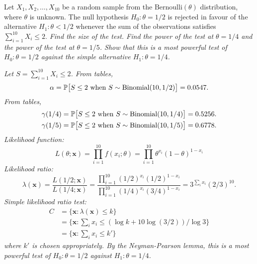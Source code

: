 \begin{example}
Let $X_1,X_2,\ldots,X_{10}$ be a random sample from the $\text{Bernoulli}(\theta)$ distribution, where $\theta$ is unknown. The null hypothesis $H_0:\theta=1/2$ is rejected in favour of the alternative $H_1:\theta < 1/2$ whenever the sum of the observations satisfies $\sum_{i=1}^{10}X_i \leq 2$. 
\ben
\it Find the size of the test.
\it Find the power of the test at $\theta=1/4$ and the power of the test at $\theta=1/5$.
\it Show that this is a most powerful test of $H_0:\theta=1/2$ against the simple alternative $H_1:\theta=1/4$.
\een
\begin{solution}
\ben
\it %
Let $S = \sum_{i=1}^{10}X_i \leq 2$. From tables,
\[
\alpha = \prob\big[S\leq 2 \text{ when } S\sim\text{Binomial}(10,1/2)\big] = 0.0547.%
\]
\it %
From tables,
\begin{align*}
\gamma(1/4) & = \mathbb{P}\big[S\leq 2 \text{ when } S\sim\text{Binomial}(10,1/4)\big] = 0.5256. \\
\gamma(1/5) & = \mathbb{P}\big[S\leq 2 \text{ when } S\sim\text{Binomial}(10,1/5)\big] = 0.6778.
\end{align*}
\it %
Likelihood function:
\[
L(\theta;\mathbf{x}) = \prod_{i=1}^{10}f(x_i;\theta) = \prod_{i=1}^{10}\theta^{x_i}(1-\theta)^{1-x_i}
\]
Likelihood ratio:
\[
\lambda(\mathbf{x}) 
	= \frac{L(1/2;\mathbf{x})}{L(1/4;\mathbf{x})}
	= \frac{\prod_{i=1}^{10}(1/2)^{x_i}(1/2)^{1-x_i}}{\prod_{i=1}^{10}(1/4)^{x_i}(3/4)^{1-x_i}}
	= 3^{\sum_i x_i}(2/3)^{10}.
\]
Simple likelihood ratio test: 
\begin{align*}
C 
	& = \{\mathbf{x}:\lambda(\mathbf{x})\leq k\} \\
	& = \big\{\mathbf{x}:\sum_i x_i \leq (\log k + 10\log(3/2))/\log 3 \big\} \\
	& = \{\mathbf{x}:\sum_i x_i \leq k' \}
\end{align*}	
where $k'$ is chosen appropriately. By the Neyman-Pearson lemma, this is a most powerful test of $H_0:\theta=1/2$ against $H_1:\theta=1/4$.
\een
\end{solution}
\end{example}


